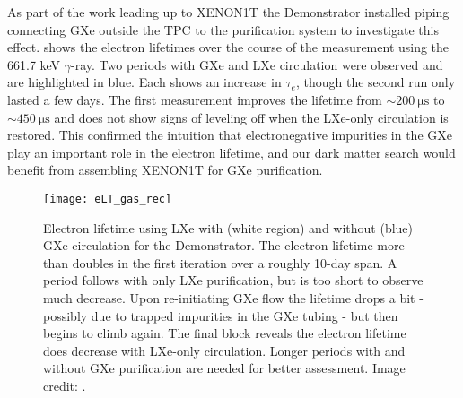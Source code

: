 As part of the work leading up to XENON1T the Demonstrator installed piping connecting GXe outside the TPC to the
purification system to investigate this effect.   shows the electron lifetimes over
the course of the measurement using the 661.7 keV  $\gamma$-ray.  Two periods with GXe and LXe circulation were observed and
are highlighted in blue.  Each shows an increase in
$\tau_e$, though the second run only lasted a few days.  The first measurement improves the lifetime from
${\sim} 200\ \mathrm{\mu s}$ to ${\sim} 450\ \mathrm{\mu s}$ and does not show signs of leveling off when the LXe-only circulation is
restored.  This confirmed the intuition that electronegative impurities in the GXe play an important role in the electron
lifetime, and our dark matter search would benefit from assembling XENON1T for GXe purification.

\begin{figure}
\centering
\texttt{[image: eLT\_gas\_rec]}
\caption[Electron lifetime using LXe with and without GXe circulation for the Demonstrator.]{Electron lifetime using LXe with (white region)
and without (blue) GXe circulation for the Demonstrator.  The electron lifetime
more than doubles in the first iteration over a roughly 10-day span.  A period follows with
only LXe purification, but is too short to observe much decrease.  Upon re-initiating GXe flow the lifetime drops a bit - possibly due to
trapped impurities in the GXe tubing - but then begins to climb again.  The final block reveals the electron lifetime does
decrease with LXe-only circulation.  Longer periods with and without GXe purification are needed for better assessment.  Image credit:
.}
\label{fig:electron_lifetime_model_gxe_demonstrator}
\end{figure}

